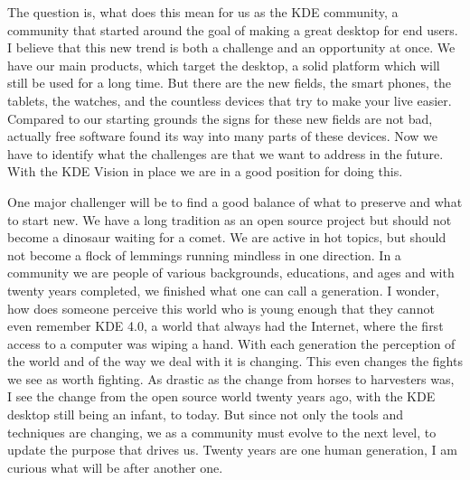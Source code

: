 The question is, what does this mean for us as the KDE community, a community that started around the goal of making a great desktop for end users. I believe that this new trend is both a challenge and an opportunity at once. We have our main products, which target the desktop, a solid platform which will still be used for a long time. But there are the new fields, the smart phones, the tablets, the watches, and the countless devices that try to make your live easier. Compared to our starting grounds the signs for these new fields are not bad, actually free software found its way into many parts of these devices. Now we have to identify what the challenges are that we want to address in the future. With the KDE Vision in place we are in a good position for doing this.

One major challenger will be to find a good balance of what to preserve and what to start new. We have a long tradition as an open source project but should not become a dinosaur waiting for a comet. We are active in hot topics, but should not become a flock of lemmings running mindless in one direction. In a community we are people of various backgrounds, educations, and ages and with twenty years completed, we finished what one can call a generation. I wonder, how does someone perceive this world who is young enough that they cannot even remember KDE 4.0, a world that always had the Internet, where the first access to a computer was wiping a hand. With each generation the perception of the world and of the way we deal with it is changing. This even changes the fights we see as worth fighting. As drastic as the change from horses to harvesters was, I see the change from the open source world twenty years ago, with the KDE desktop still being an infant, to today. But since not only the tools and techniques are changing, we as a community must evolve to the next level, to update the purpose that drives us. Twenty years are one human generation, I am curious what will be after another one.

